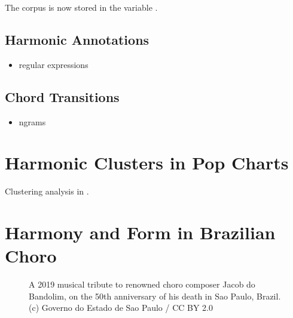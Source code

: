 \documentclass[letterpaper,10pt,english]{sphinxmanual}
\begin{document}
\begin{sphinxVerbatim}[commandchars=\\\{\}]
   

   
\end{sphinxVerbatim}

The corpus is now stored in the variable .


\section{Harmonic Annotations}
\label{\detokenize{beethoven_harmony:harmonic-annotations}}\begin{itemize}
\item {} 
regular expressions

\end{itemize}



\section{Chord Transitions}
\label{\detokenize{beethoven_harmony:chord-transitions}}\begin{itemize}
\item {} 
n\sphinxhyphen{}grams

\end{itemize}


\chapter{Harmonic Clusters in Pop Charts}
\label{\detokenize{billboard:harmonic-clusters-in-pop-charts}}\label{\detokenize{billboard::doc}}

Clustering analysis in .


\chapter{Harmony and Form in Brazilian Choro}
\label{\detokenize{choro:harmony-and-form-in-brazilian-choro}}\label{\detokenize{choro::doc}}
\begin{figure}[htbp]
\centering
\capstart

\noindent{}
\caption{A 2019 musical tribute to renowned choro composer Jacob do Bandolim,
on the 50th anniversary of his death in Sao Paulo, Brazil. (c) Governo do Estado de Sao Paulo / CC BY 2.0}\label{\detokenize{choro:id2}}\end{figure}
\end{document}
